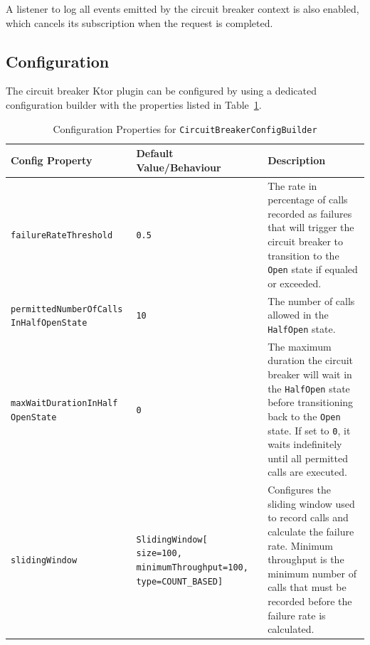 A listener to log all events emitted by the circuit breaker context is also enabled, which cancels its subscription when the request is completed.

\subsection{Configuration}\label{subsec:circuit-breaker-configuration}

The circuit breaker Ktor plugin can be configured
by using a dedicated configuration builder with the properties listed in Table~\ref{tab:circuit-breaker-config-builder}.

\begin{table}[!htb]
    \centering
    \caption{Configuration Properties for \texttt{CircuitBreakerConfigBuilder}}
    \label{tab:circuit-breaker-config-builder}
    \vspace{0.3cm}
    \begin{tabular}{|p{5cm}|p{5cm}|p{6cm}|}
        \hline
        \textbf{Config Property}                   & \textbf{Default Value/Behaviour}                                                     & \textbf{Description}                                                                                                                                        \\ \hline
        \texttt{failureRateThreshold}              & \texttt{0.5}                                                                         & The rate in percentage of calls recorded as failures that will trigger the circuit breaker to transition to the \texttt{Open} state if equaled or exceeded. \\ \hline
        \texttt{permittedNumberOfCalls InHalfOpenState} & \texttt{10} & The number of calls
        allowed in the \texttt{HalfOpen} state. \\ \hline
        \texttt{maxWaitDurationInHalf OpenState} & \texttt{0} & The maximum duration
        the circuit breaker will wait in the \texttt{HalfOpen} state before transitioning back to the \texttt{Open} state.
        If set to \texttt{0}, it waits indefinitely until all permitted calls are executed. \\ \hline
        \texttt{slidingWindow} & \texttt{SlidingWindow[ size=100, minimumThroughput=100, type=COUNT\_BASED]}
        & Configures the sliding window used to record calls and calculate the failure rate.
        Minimum throughput is the minimum number of calls
        that must be recorded before the failure rate is calculated.
        \\ \hline

\end{tabular}
\end{table}
